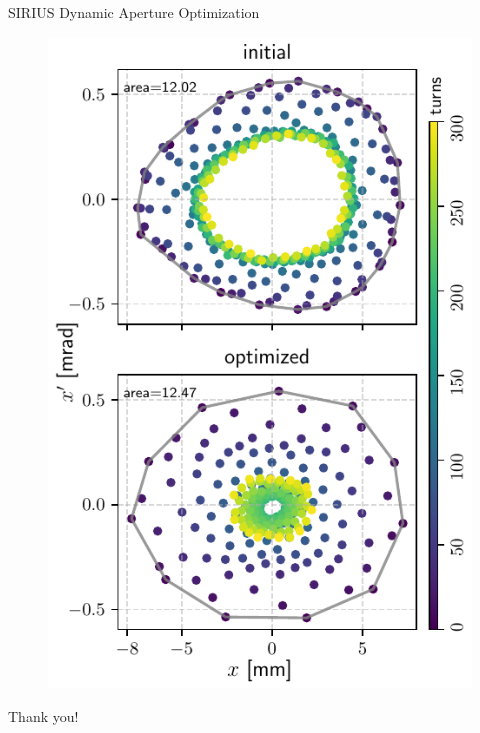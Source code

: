 \documentclass[aspectratio=169]{beamer}
\begin{document}
\begin{frame}{SIRIUS Dynamic Aperture Optimization}
\begin{minipage}{0.44\textwidth}
\begin{figure}
            \includegraphics[height=0.9\textheight]{wp3_phase_space.pdf}
        \end{figure}
    \end{minipage}
\end{frame}
\begin{frame}
    Thank you!
\end{frame}
\end{document}
